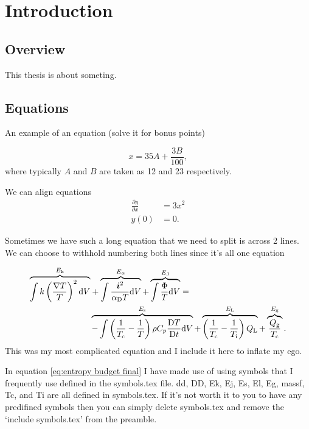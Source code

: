 \chapter[Introduction]{Introduction}  %
\label{ch:introduction}

\section{Overview}

This thesis is about someting.


\section{Equations}

An example of an equation (solve it for bonus points)

\begin{equation}
     x = 35A + \frac{3B}{100},
\end{equation} where typically $A$ and $B$ are taken as 12 and 23 respectively.

We can align equations 
\begin{align}
    \frac{\partial y}{\partial x} &= 3x^2 \\
    y(0) &= 0.
\end{align}

Sometimes we have such a long equation that we need to split is across 2 lines. We can choose to withhold numbering both lines since it's all one equation

\begin{align}
    \overbrace{\int k\left(\frac{\nabla T}{T}\right)^2\mathrm{d} V}^{E_{\mathrm{k}}}
    &+ \overbrace{\int\frac{\bm{i}^2}{\alpha_\mathrm{D} T}\mathrm{d} V}^{E_{\alpha}}
    + \overbrace{\int\frac{\Phi}{T} \mathrm{d} V}^{E_{\mathrm{J}}} = \nonumber\\
    & \overbrace{-\int\left(\frac{1}{T_{\mathrm{c}}}-\frac{1}{T}\right)\rho C_p\frac{\mathrm{D} T}{\mathrm{D} t}\mathrm{d} V}^{E_{\mathrm{s}}}
    + \overbrace{\left(\frac{1}{T_{\mathrm{c}}}-\frac{1}{T_{\mathrm{i}}}\right)Q_{\mathrm{L}}}^{E_{\mathrm{L}}}
    + \overbrace{\frac{Q_{\mathrm{g}}}{T_{\mathrm{c}}}}^{E_{\mathrm{g}}}.
\label{eq:entropy budget final}
\end{align}This was my most complicated equation and I include it here to inflate my ego.

In equation \ref{eq:entropy budget final} I have made use of using symbols that I frequently use defined in the symbols.tex file. dd, DD, Ek, Ej, Es, El, Eg, massf, Tc, and Ti are all defined in symbols.tex. If it's not worth it to you to have any predifined symbols then you can simply delete symbols.tex and remove the `include symbols.tex' from the preamble.